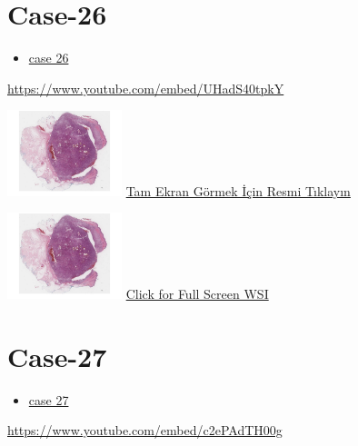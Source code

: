 \documentclass[
  letterpaper,
  paper=6in:9in,
  pagesize=pdftex,
  headinclude=on,
  footinclude=on,
  12pt]{scrbook}
\providecommand{\tightlist}{%
  \setlength{\itemsep}{0pt}\setlength{\parskip}{0pt}}\usepackage{longtable,booktabs,array}
\begin{document}
\hypertarget{sec-hacettepe-case-of-the-month-case-26}{%
\section{Case-26}\label{sec-hacettepe-case-of-the-month-case-26}}

\begin{itemize}
\tightlist
\item
  \href{https://www.youtube.com/watch?v=UHadS40tpkY\&ab_channel=KemalKosemehmetoglu}{case
  26}
\end{itemize}

\url{https://www.youtube.com/embed/UHadS40tpkY}

\href{https://images.patolojiatlasi.com/hacettepe-com-case-1/HE.html}{\includegraphics[width=0.25\textwidth,height=\textheight]{./screenshots/hacettepe-com-case-1_screenshot.png}}
\href{https://images.patolojiatlasi.com/hacettepe-com-case-/HE.html}{Tam
Ekran Görmek İçin Resmi Tıklayın}

\href{https://images.patolojiatlasi.com/hacettepe-com-case-1/HE.html}{\includegraphics[width=0.25\textwidth,height=\textheight]{./screenshots/hacettepe-com-case-1_screenshot.png}}
\href{https://images.patolojiatlasi.com/hacettepe-com-case-/HE.html}{Click
for Full Screen WSI}

\hypertarget{sec-hacettepe-case-of-the-month-case-27}{%
\section{Case-27}\label{sec-hacettepe-case-of-the-month-case-27}}

\begin{itemize}
\tightlist
\item
  \href{https://www.youtube.com/watch?v=c2ePAdTH00g\&ab_channel=KemalKosemehmetoglu}{case
  27}
\end{itemize}

\url{https://www.youtube.com/embed/c2ePAdTH00g}
\end{document}
